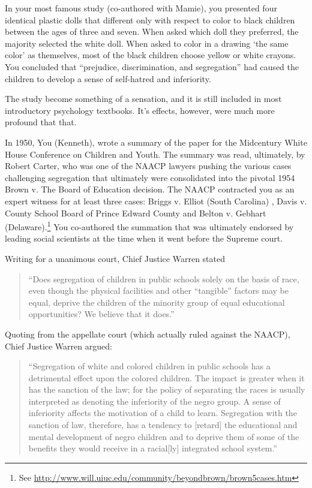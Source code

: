 \begin{refsection}
In your most famous study (co-authored with Mamie), you presented four identical plastic dolls that different only with respect to color to black children between the ages of three and seven. When asked which doll they preferred, the majority selected the white doll. When asked to color in a drawing `the same color' as themselves, most of the black children choose yellow or white crayons. You concluded that “prejudice, discrimination, and segregation” had caused the children to develop a sense of self-hatred and inferiority.

The study become something of a sensation, and it is still included in most introductory psychology textbooks. It's effects, however, were much more profound that that.

In 1950, You (Kenneth), wrote a summary of the paper for the Midcentury White House Conference on Children and Youth. The summary was read, ultimately, by Robert Carter, who was one of the NAACP lawyers pushing the various cases challenging segregation that ultimately were consolidated into the pivotal 1954 Brown v. The Board of Education decision. The NAACP contracted you as an expert witness for at least three cases: Briggs v. Elliot (South Carolina) , Davis v. County School Board of Prince Edward County and Belton v. Gebhart (Delaware).\footnote{See \url{http://www.will.uiuc.edu/community/beyondbrown/brown5cases.htm}} You co-authored the summation that was ultimately endorsed by leading social scientists at the time when it went before the Supreme court.

Writing for a unanimous court, Chief Justice Warren stated

\begin{quote}

“Does segregation of children in public schools solely on the basis of race, even though the physical facilities and other ``tangible'' factors may be equal, deprive the children of the minority group of equal educational opportunities? We believe that it does.”
\end{quote}

Quoting from the appellate court (which actually ruled against the NAACP), Chief Justice Warren argued:

\begin{quote}

``Segregation of white and colored children in public schools has a detrimental effect upon the colored children. The impact is greater when it has the sanction of the law; for the policy of separating the races is usually interpreted as denoting the inferiority of the negro group. A sense of inferiority affects the motivation of a child to learn. Segregation with the sanction of law, therefore, has a tendency to [retard] the educational and mental development of negro children and to deprive them of some of the benefits they would receive in a racial[ly] integrated school system.'' 


\end{quote}
\end{refsection}
